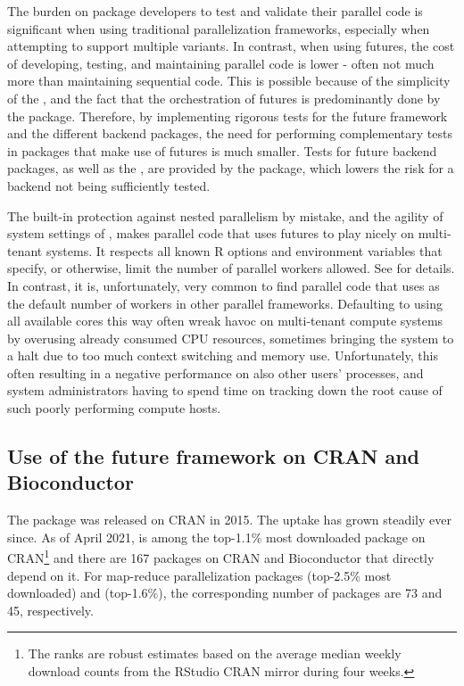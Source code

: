 The burden on package developers to test and validate their parallel
code is significant when using traditional parallelization frameworks,
especially when attempting to support multiple variants.  In contrast,
when using futures, the cost of developing, testing, and maintaining
parallel code is lower - often not much more than maintaining
sequential code.  This is possible because of the simplicity of the
, and the fact that the orchestration of futures is
predominantly done by the  package.  Therefore, by
implementing rigorous tests for the future framework and the different
backend packages, the need for performing complementary tests in
packages that make use of futures is much smaller.  Tests for future
backend packages, as well as the , are provided by
the  package, which lowers the risk for a backend
not being sufficiently tested.

The built-in protection against nested parallelism by mistake, and the
agility of system settings of , makes parallel
code that uses futures to play nicely on multi-tenant systems.  It
respects all known R options and environment variables that specify,
or otherwise, limit the number of parallel workers allowed.
See  for
details.  In contrast, it is, unfortunately, very common to find
parallel code that uses  as the default
number of workers in other parallel frameworks.  Defaulting to using
all available cores this way often wreak havoc on multi-tenant compute
systems by overusing already consumed CPU resources, sometimes
bringing the system to a halt due to too much context switching and
memory use.  Unfortunately, this often resulting in a negative
performance on also other users' processes, and system administrators
having to spend time on tracking down the root cause of such poorly
performing compute hosts.


\subsection{Use of the future framework on CRAN and Bioconductor}
\label{use-of-the-future-framework}

The  package was released on CRAN in 2015. The uptake has
grown steadily ever since.  As of April 2021,  is among
the top-1.1\% most downloaded package on CRAN\footnote{The ranks are
robust estimates based on the average median weekly download counts
from the RStudio CRAN mirror during four weeks.} and there are 167
packages on CRAN and Bioconductor that directly depend on it.  For
map-reduce parallelization packages  (top-2.5\% most
downloaded) and  (top-1.6\%), the corresponding number of
packages are 73 and 45, respectively.

